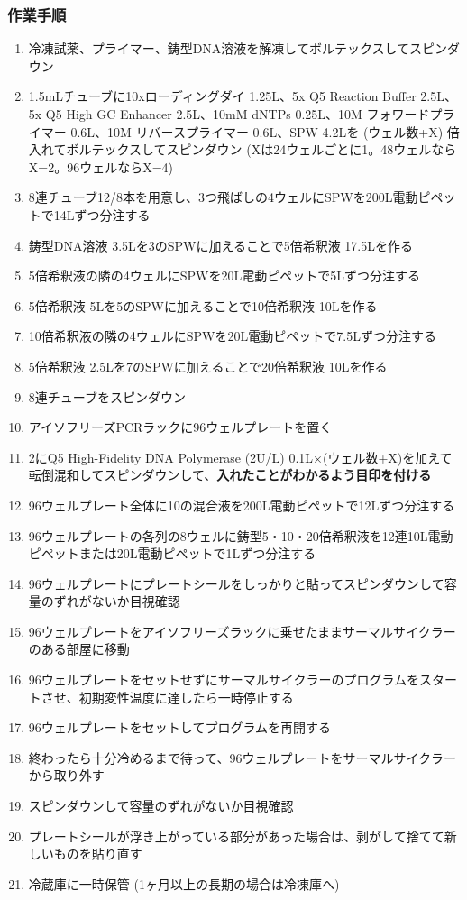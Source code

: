\documentclass[titlepage,10pt,a4paper,uplatex]{jsbook}
\renewcommand{\textbf}[1]{{\bfseries\sffamily#1}}
\begin{document}
\subsubsection{作業手順}
\begin{enumerate}
\item 冷凍試薬、プライマー、鋳型DNA溶液を解凍してボルテックスしてスピンダウン
\item 1.5mLチューブに10xローディングダイ 1.25{\textmu}L、5x Q5 Reaction Buffer 2.5{\textmu}L、5x Q5 High GC Enhancer 2.5{\textmu}L、10mM dNTPs 0.25{\textmu}L、10{\textmu}M フォワードプライマー 0.6{\textmu}L、10{\textmu}M リバースプライマー 0.6{\textmu}L、SPW 4.2{\textmu}Lを (ウェル数+X) 倍入れてボルテックスしてスピンダウン (Xは24ウェルごとに1。48ウェルならX=2。96ウェルならX=4)
\item 8連チューブ12/8本を用意し、3つ飛ばしの4ウェルにSPWを200{\textmu}L電動ピペットで14{\textmu}Lずつ分注する
\item 鋳型DNA溶液 3.5{\textmu}Lを3のSPWに加えることで5倍希釈液 17.5{\textmu}Lを作る
\item 5倍希釈液の隣の4ウェルにSPWを20{\textmu}L電動ピペットで5{\textmu}Lずつ分注する
\item 5倍希釈液 5{\textmu}Lを5のSPWに加えることで10倍希釈液 10{\textmu}Lを作る
\item 10倍希釈液の隣の4ウェルにSPWを20{\textmu}L電動ピペットで7.5{\textmu}Lずつ分注する
\item 5倍希釈液 2.5{\textmu}Lを7のSPWに加えることで20倍希釈液 10{\textmu}Lを作る
\item 8連チューブをスピンダウン
\item アイソフリーズPCRラックに96ウェルプレートを置く
\item 2にQ5 High-Fidelity DNA Polymerase (2U/{\textmu}L) 0.1{\textmu}L×(ウェル数+X)を加えて転倒混和してスピンダウンして、\textbf{入れたことがわかるよう目印を付ける}
\item 96ウェルプレート全体に10の混合液を200{\textmu}L電動ピペットで12{\textmu}Lずつ分注する
\item 96ウェルプレートの各列の8ウェルに鋳型5・10・20倍希釈液を12連10{\textmu}L電動ピペットまたは20{\textmu}L電動ピペットで1{\textmu}Lずつ分注する
\item 96ウェルプレートにプレートシールをしっかりと貼ってスピンダウンして容量のずれがないか目視確認
\item 96ウェルプレートをアイソフリーズラックに乗せたままサーマルサイクラーのある部屋に移動
\item 96ウェルプレートをセットせずにサーマルサイクラーのプログラムをスタートさせ、初期変性温度に達したら一時停止する
\item 96ウェルプレートをセットしてプログラムを再開する
\item 終わったら十分冷めるまで待って、96ウェルプレートをサーマルサイクラーから取り外す
\item スピンダウンして容量のずれがないか目視確認
\item プレートシールが浮き上がっている部分があった場合は、剥がして捨てて新しいものを貼り直す
\item 冷蔵庫に一時保管 (1ヶ月以上の長期の場合は冷凍庫へ)
\end{enumerate}
\end{document}
